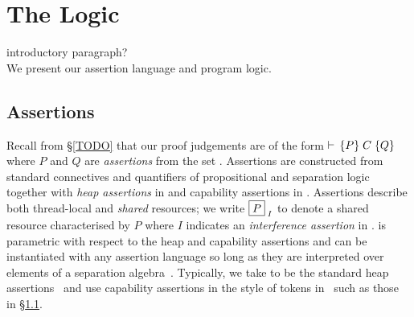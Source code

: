\section{The \colosl Logic}\label{sec:logic}
\todo introductory paragraph?\\
We present our assertion language and program logic. 

\subsection{\colosl Assertions}
Recall from \S\ref{TODO} that our proof judgements are of the form
$\vdash\,\{P\}\;C\;\{Q\}$ where $P$ and $Q$ are \emph{assertions} from the set
\Assertions. Assertions are constructed from standard connectives and
quantifiers of propositional and separation logic together with
\emph{heap assertions} in \HAssertions and capability assertions in
\KAssertions. Assertions describe both thread-local and \emph{shared}
resources; we write $\boxed{P}_{\; I}$ to denote a shared resource
characterised by $P$ where $I$ indicates an \emph{interference
  assertion} in \IAssertions. \colosl is parametric with respect to
the heap and capability assertions and can be instantiated with any
assertion language so long as they are interpreted over elements of a
separation algebra~\cite{asl}. Typically, we take
\HAssertions to be the standard heap assertions~\cite{rey02} and
use capability assertions in the style of tokens in~\cite{TODO}
such as those in \S\ref{}.
% 
